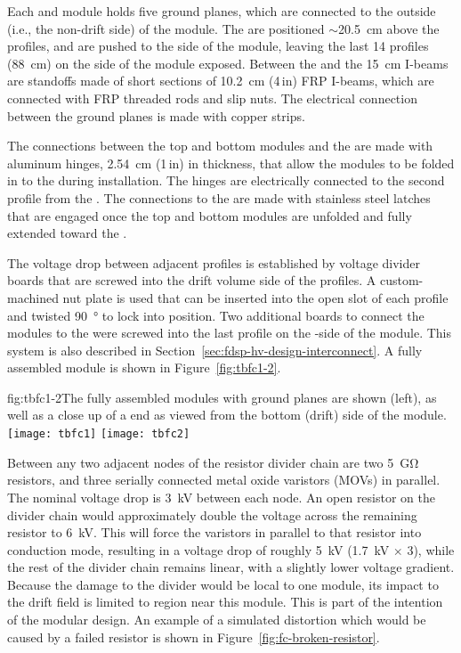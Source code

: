 Each  and  module holds five ground planes, which are connected to the outside (i.e., the non-drift side) of the module. The  are positioned $\sim$\SI{20.5}{\cm} above the profiles, and are pushed to the  side of the module, leaving the last 14 profiles (\SI{88}{\cm}) on the  side of the module exposed. Between the  and the \SI{15}{\cm} I-beams are standoffs made of short sections of \SI{10.2}{\cm} (4\,in)  FRP I-beams, which are connected with FRP threaded rods and slip nuts. The electrical connection between the ground planes is made with copper strips.

The connections between the top and bottom modules and the  are made with aluminum hinges, \SI{2.54}{\cm} (1\,in) in thickness, that allow the modules to be folded in to the  during installation. The hinges are electrically connected to the second profile from the . The connections to the  are made with stainless steel latches that are engaged once the top and bottom modules are unfolded and fully extended toward the .

The voltage drop between adjacent profiles is established by voltage divider boards that are screwed into the drift volume side of the profiles. A custom-machined nut plate is used that can be inserted into the open slot of each profile and twisted \SI{90}{\degree} %
to lock into position. Two additional boards to connect the modules to the  were screwed into the last profile on the -side of the module. This system is also described in Section~\ref{sec:fdsp-hv-design-interconnect}. A fully assembled module is shown in Figure~\ref{fig:tbfc1-2}.

\begin{dunefigure}{fig:tbfc1-2}{The fully assembled modules with ground planes are shown (left), as well as a close up of a  end as viewed from the bottom (drift) side of the module.}
\texttt{[image: tbfc1]}
\texttt{[image: tbfc2]}
\end{dunefigure}

Between any two adjacent nodes of the resistor divider chain are two \SI{5}{\giga\ohm} resistors, and three serially connected metal oxide varistors (MOVs) in parallel.  The nominal voltage drop is \SI{3}{kV} between each node.
An open resistor on the divider chain would approximately double the voltage across the remaining resistor to \SI{6}{kV}.  This will force the varistors in parallel to that resistor into conduction mode, resulting in a voltage drop of roughly \SI{5}{kV} (\SI{1.7}{kV} $\times$ \num{3}), while the rest of the divider chain remains linear, with a slightly lower voltage gradient.
Because the damage to the divider would be local to one module, its impact to the  drift field is limited to region near this module.  This is part of the intention of the modular design.
An example of a simulated \efield{} distortion which would be caused by a failed resistor is shown in Figure~\ref{fig:fc-broken-resistor}. 


